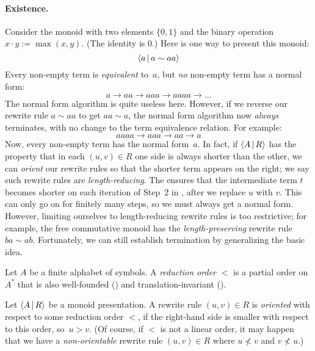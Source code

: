 \documentclass[../generics]{subfiles}
\begin{document}
\paragraph{Existence.} Consider the monoid with two elements $\{0,1\}$ and the binary operation $x\cdot y:=\max(x,y)$. (The identity is 0.) Here is one way to present this monoid:
\[ \langle a\,|\,a\sim aa\rangle \]
Every non-empty term is \emph{equivalent} to~$a$, but \emph{no} non-empty term has a normal form:
\[ a \rightarrow aa \rightarrow aaa \rightarrow aaaa \rightarrow \ldots \]
The normal form algorithm is quite useless here. However, if we reverse our rewrite rule $a\sim aa$ to get $aa\sim a$, the normal form algorithm now \emph{always} terminates, with no change to the term equivalence relation. For example:
\[ aaaa \rightarrow aaa \rightarrow aa \rightarrow a \]
Now, every non-empty term has the normal form~$a$. In fact, if $\langle A\,|\,R\rangle$ has the property that in each $(u,v)\in R$ one side is always shorter than the other, we can \emph{orient} our rewrite rules so that the shorter term appears on the right; we say such rewrite rules are \emph{length-reducing}. The ensures that the intermediate term $t$ becomes shorter on each iteration of Step~2 in , after we replace $u$ with $v$. This can only go on for finitely many steps, so we must always get a normal form. However, limiting ourselves to length-reducing rewrite rules is too restrictive; for example, the free commutative monoid has the \emph{length-preserving} rewrite rule $ba\sim ab$. Fortunately, we can still establish termination by generalizing the basic idea.

\begin{definition}\label{reduction order def}
Let $A$ be a finite alphabet of symbols. A \emph{reduction order} $<$ is a partial order on $A^*$ that is also well-founded () and translation-invariant ().
\end{definition}

\begin{definition}
Let $\langle A\,|\,R\rangle$ be a monoid presentation. A rewrite rule $(u,v)\in R$ is \emph{oriented} with respect to some reduction order $<$, if the right-hand side is smaller with respect to this order, so~$u>v$. (Of course, if $<$ is not a linear order, it may happen that we have a \emph{non-orientable} rewrite rule $(u,v)\in R$ where $u\not< v$ and $v\not< u$.)
\end{definition}
\end{document}
